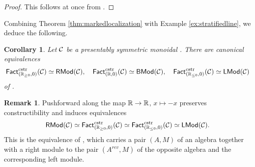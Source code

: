 \documentclass[10pt, reqno, twoside
, final
]{amsart}
\numberwithin{equation}{subsection}%
\theoremstyle{definition}
\theoremstyle{definition}
\theoremstyle{definition}
\theoremstyle{definition}
\theoremstyle{definition}
\theoremstyle{definition}
\theoremstyle{definition}
\theoremstyle{definition}
\theoremstyle{definition}
\theoremstyle{plain}
\theoremstyle{definition}
\theoremstyle{plain}
\theoremstyle{definition}
\theoremstyle{plain}
\newtheorem{cor}[defn]{Corollary}
\theoremstyle{definition}
\newtheorem{rmk}[defn]{Remark}
\theoremstyle{definition}
\theoremstyle{plain}
\theoremstyle{plain}
\theoremstyle{definition}
\theoremstyle{plain}
\theoremstyle{plain}
\theoremstyle{plain}
\begin{document}
\begin{proof}
This follows at once from \cite[Corollary 3.2.3.5]{LurHA}.    
\end{proof}
Combining Theorem \ref{thm:markedlocalization} with Example \ref{ex:stratifiedline}, we deduce the following.
\begin{cor}\label{cor:Fact-bimod}
Let $\mathcal{C}$ be a presentably symmetric monoidal \infcatt. There are canonical equivalences
\[  \mathsf{Fact}^{\mathrm{cstr}}_{(\mathbb{R}_{\geq 0},0)}(\mathcal{C})\simeq \mathsf{RMod}(\mathcal{C}), \quad \mathsf{Fact}^{\mathrm{cstr}}_{(\mathbb{R},0)}(\mathcal{C})\simeq \mathsf{BMod}(\mathcal{C}),\quad \mathsf{Fact}^{\mathrm{cstr}}_{(\mathbb{R}_{\leq 0},0)}(\mathcal{C})\simeq \mathsf{LMod}(\mathcal{C})\]
of \infcatst.
\end{cor}
\begin{rmk}
Pushforward along the map $\mathbb{R}\rightarrow \mathbb{R}$, $x\mapsto -x$ preserves constructibility and induces equivalences 
\[ \mathsf{RMod}(\mathcal{C})\simeq  \mathsf{Fact}^{\mathrm{cstr}}_{(\mathbb{R}_{\geq 0},0)}(\mathcal{C})\simeq \mathsf{Fact}^{\mathrm{cstr}}_{(\mathbb{R}_{\leq 0},0)}(\mathcal{C})  \simeq  \mathsf{LMod}(\mathcal{C}). \]
This is the equivalence of \cite[Construction 4.6.3.1]{LurHA}, which carries a pair $(A,M)$ of an algebra together with a right module to the pair $(A^{rev},M)$ of the opposite algebra and the corresponding left module.
\end{rmk}
\end{document}
